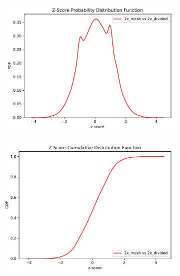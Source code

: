 \begin{figure}
	\begin{subfigure}[h]{0.5\textwidth}
		\includegraphics[width=\linewidth, trim={0cm 0cm 0cm 0.9cm},clip]{../figs/toy_p1/PDF_zscore_VPI_2xm_2xs.pdf}
		\label{fig:1dose_2x_split}
	\end{subfigure}\hfill
	\begin{subfigure}[h]{0.5\textwidth}
		\includegraphics[width=\linewidth, trim={0cm 0cm 0cm 0.8cm},clip]{../figs/toy_p1/CDF_zscore_VPI_2xm_2xs.pdf}
		\label{fig:1dose_2x_mesh}
	\end{subfigure}


\end{figure}
